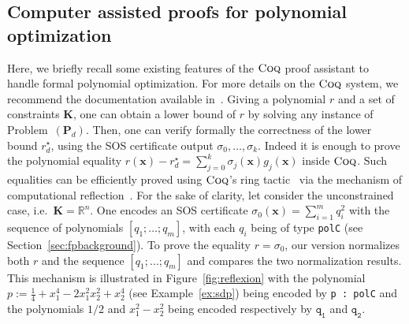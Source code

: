 \documentclass[preprint]{sigplanconf}
\newcommand{\code}[1]{\lstinline{#1}}
\newcommand{\R}{\mathbb{R}}
\newcommand{\x}{\mathbf{x}}
\def\P{\mathbf{P}}
\def\K{\mathbf{K}}
\newcommand{\coq}{\text{\sc Coq}}
\theoremstyle{plain}
\begin{document}
\subsection{Computer assisted proofs for polynomial optimization}
\label{sec:coqbackground}
Here, we briefly recall some existing features of the $\coq$ proof assistant to handle formal polynomial optimization.
For more details on the $\coq$ system, we recommend the
documentation available in~\cite{bertot2004interactive}.
Giving a polynomial $r$ and a set of constraints $\K$, one can obtain a lower bound of $r$ by solving any instance of Problem~$(\P_d)$. Then, one can verify formally the correctness of the lower bound $r_d^\star$, using the SOS certificate output $\sigma_0, \dots, \sigma_k$. Indeed it is enough to prove the polynomial equality $r(\x) - r_d^\star = \sum_{j=0}^k \sigma_j(\x) g_j(\x)$ inside $\coq$. Such equalities can be efficiently proved using $\coq$'s ring tactic~\cite{ring05} via the mechanism of computational reflection~\cite{Boutin97usingreflection}.
For the sake of clarity, let consider the unconstrained case, i.e.~$\K = \R^n$. One encodes an SOS certificate $\sigma_0(\x) = \sum_{i=1}^m q_i^2$  with the sequence of polynomials $[q_1; \dots; q_m]$, with each $q_i$ being of type \code{polC} (see Section~\ref{sec:fpbackground}). To prove the equality $r = \sigma_0$, our version normalizes both $r$ and the sequence $[q_1; \dots; q_m]$ and compares the two normalization results. This mechanism is illustrated in Figure~\ref{fig:reflexion} with the polynomial $p := \frac{1}{4} + x_1^4 - 2 x_1^2 x_2^2 + x_2^4$ (see Example~\ref{ex:sdp}) being encoded by \code{p : polC}  and the polynomials $1/2$ and $x_1^2 - x_2^2$ being encoded respectively by $\mathtt{q_1}$ and $\mathtt{q_2}$. 
\end{document}
